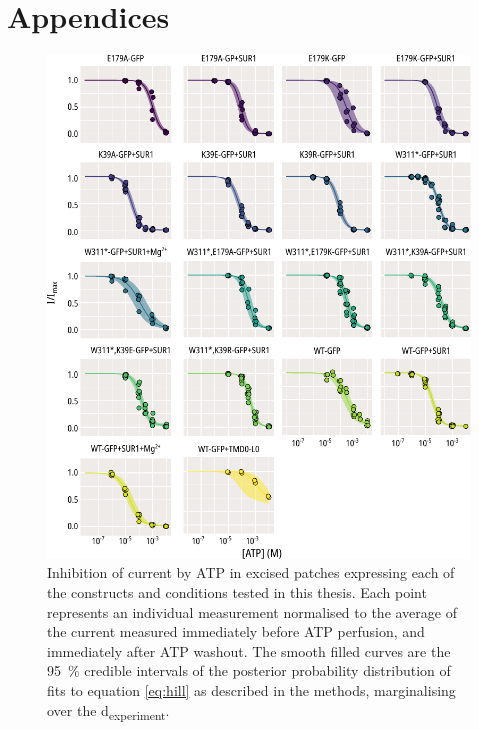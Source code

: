 \chapter{\label{ch:8-appendix}Appendices} 

\graphicspath{{figures/appendix/}}

\begin{figure}[h]
	\centering
	\includegraphics[width=\textwidth]{all_atp_fits.pdf}
	\caption[ATP inhibition population hill fits]{
	Inhibition of current by ATP in excised patches expressing each of the constructs and conditions tested in this thesis.
	Each point represents an individual measurement normalised to the average of the current measured immediately before ATP perfusion, and immediately after ATP washout.
	The smooth filled curves are the \SI{95}{\percent} credible intervals of the posterior probability distribution of fits to equation \ref{eq:hill} as described in the methods, marginalising over the \textgreek{d}\textsubscript{experiment}.
	}
	\label{apxfig:atp_inhib_1}
\end{figure}

